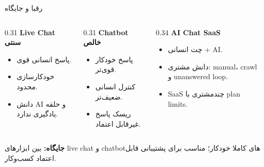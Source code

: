 \documentclass[aspectratio=169,12pt]{beamer}
\begin{document}
\begin{frame}{رقبا و جایگاه}
  \begin{columns}[T,totalwidth=\textwidth]
    \begin{column}{0.31\textwidth}
      \textbf{Live Chat سنتی}
      \begin{itemize}
        \item پاسخ انسانی قوی.
        \item خودکارسازی محدود.
        \item دانش AI و حلقه یادگیری ندارد.
      \end{itemize}
    \end{column}
    \begin{column}{0.31\textwidth}
      \textbf{Chatbot خالص}
      \begin{itemize}
        \item پاسخ خودکار قوی‌تر.
        \item کنترل انسانی ضعیف‌تر.
        \item ریسک پاسخ غیرقابل اعتماد.
      \end{itemize}
    \end{column}
    \begin{column}{0.34\textwidth}
      \textbf{\color{primary}AI Chat SaaS}
      \begin{itemize}
        \item چت انسانی + AI.
        \item دانش مشتری: manual، crawl و unanswered loop.
        \item SaaS چندمشتری با plan limits.
      \end{itemize}
    \end{column}
  \end{columns}

  \vspace{4mm}
  \begin{center}
    \textbf{\color{accent}جایگاه:} بین ابزارهای live chat و chatbotهای کاملا خودکار؛ مناسب برای پشتیبانی قابل اعتماد کسب‌وکار.
  \end{center}
\end{frame}
\end{document}
